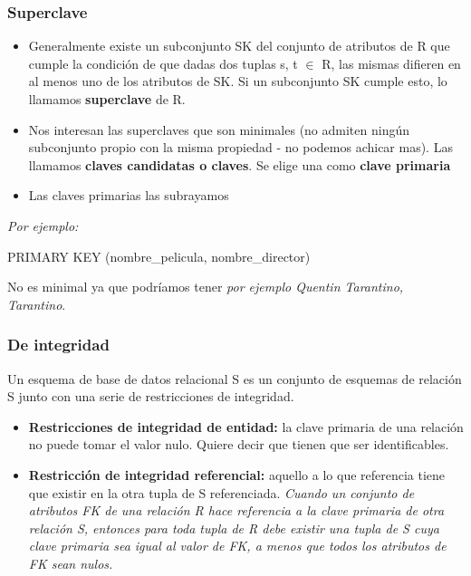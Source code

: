 \subsubsection*{Superclave}

\begin{itemize}
\item Generalmente existe un subconjunto SK del conjunto de atributos de R que cumple la condición de que dadas dos tuplas s, t $\in$ R, las mismas difieren en al menos uno de los atributos de SK. Si un subconjunto SK cumple esto, lo llamamos \textbf{superclave} de R.
\item Nos interesan las superclaves que son minimales (no admiten ningún subconjunto propio con la misma propiedad - no podemos achicar mas). Las llamamos \textbf{claves candidatas o claves}. Se elige una como \textbf{clave primaria}
\item Las claves primarias las subrayamos
\end{itemize}

\textit{Por ejemplo:}

\begin{center}
PRIMARY KEY (nombre\_pelicula, nombre\_director)
\end{center}

\medskip

No es minimal ya que podríamos tener\textit{ por ejemplo Quentin Tarantino, Tarantino}.


\subsubsection*{De integridad}
Un esquema de base de datos relacional S es un conjunto de esquemas de relación S junto con una serie de restricciones de integridad.

\begin{itemize}
\item \textbf{Restricciones de integridad de entidad:} la clave primaria de una relación no puede tomar el valor nulo. Quiere decir que tienen que ser identificables.
\item \textbf{Restricción de integridad referencial:} aquello a lo que referencia tiene que existir en la otra tupla de S referenciada. \textit{Cuando un conjunto de atributos FK de una relación R hace referencia a la clave primaria de otra relación S, entonces para toda tupla de R debe existir una tupla de S cuya clave primaria sea igual al valor de FK, a menos que todos los atributos de FK sean nulos.}
\end{itemize}

